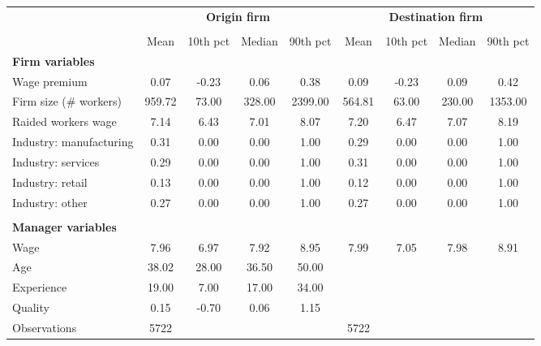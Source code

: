 {
\def\sym#1{\ifmmode^{#1}\else\(^{#1}\)\fi}
\begin{tabular}{l*{2}{cccc}}
\toprule
                    &\multicolumn{4}{c}{\textbf{Origin firm}}           &\multicolumn{4}{c}{\textbf{Destination firm}}      \\\cmidrule(lr){2-5}\cmidrule(lr){6-9}
                    &\multicolumn{4}{c}{}                               &\multicolumn{4}{c}{}                               \\
                    &        Mean&    10th pct&      Median&    90th pct&        Mean&    10th pct&      Median&    90th pct\\
\midrule
\textbf{Firm variables}&            &            &            &            &            &            &            &            \\
Wage premium        &        0.07&       -0.23&        0.06&        0.38&        0.09&       -0.23&        0.09&        0.42\\
Firm size (\# workers)&      959.72&       73.00&      328.00&     2399.00&      564.81&       63.00&      230.00&     1353.00\\
Raided workers wage &        7.14&        6.43&        7.01&        8.07&        7.20&        6.47&        7.07&        8.19\\
Industry: manufacturing&        0.31&        0.00&        0.00&        1.00&        0.29&        0.00&        0.00&        1.00\\
Industry: services  &        0.29&        0.00&        0.00&        1.00&        0.31&        0.00&        0.00&        1.00\\
Industry: retail    &        0.13&        0.00&        0.00&        1.00&        0.12&        0.00&        0.00&        1.00\\
Industry: other     &        0.27&        0.00&        0.00&        1.00&        0.27&        0.00&        0.00&        1.00\\
\\ \textbf{Manager variables}&            &            &            &            &            &            &            &            \\
Wage                &        7.96&        6.97&        7.92&        8.95&        7.99&        7.05&        7.98&        8.91\\
Age                 &       38.02&       28.00&       36.50&       50.00&            &            &            &            \\
Experience          &       19.00&        7.00&       17.00&       34.00&            &            &            &            \\
Quality             &        0.15&       -0.70&        0.06&        1.15&            &            &            &            \\
\midrule
Observations        &        5722&            &            &            &        5722&            &            &            \\
\bottomrule
\end{tabular}
}
